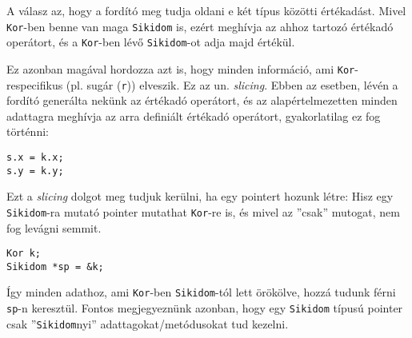 \documentclass[a4paper,11.5pt]{article}
\begin{document}
	A válasz az, hogy a fordító meg tudja oldani e két típus közötti értékadást. Mivel \texttt{Kor}-ben benne van maga \texttt{Sikidom} is, ezért meghívja az ahhoz tartozó értékadó operátort, és a \texttt{Kor}-ben lévő \texttt{Sikidom}-ot adja majd értékül.
	
	Ez azonban magával hordozza azt is, hogy minden információ, ami \texttt{Kor}-respecifikus (pl. sugár (\texttt{r})) elveszik. Ez az un. \textit{slicing}. Ebben az esetben, lévén a fordító generálta nekünk az értékadó operátort, és az alapértelmezetten minden adattagra meghívja az arra definiált értékadó operátort, gyakorlatilag ez fog történni:
	\begin{lstlisting}
s.x = k.x;
s.y = k.y;
	\end{lstlisting}
	
	Ezt a \textit{slicing} dolgot meg tudjuk kerülni, ha egy pointert hozunk létre: Hisz egy \texttt{Sikidom}-ra mutató pointer mutathat \texttt{Kor}-re is, és mivel az ''csak'' mutogat, nem fog levágni semmit. 
	\begin{lstlisting}
Kor k;
Sikidom *sp = &k;
	\end{lstlisting}
	Így minden adathoz, ami \texttt{Kor}-ben \texttt{Sikidom}-tól lett örökölve, hozzá tudunk férni \texttt{sp}-n keresztül. Fontos megjegyeznünk azonban, hogy egy \texttt{Sikidom} típusú pointer csak ''\texttt{Sikidom}nyi'' adattagokat/metódusokat tud kezelni.
	
\end{document}
